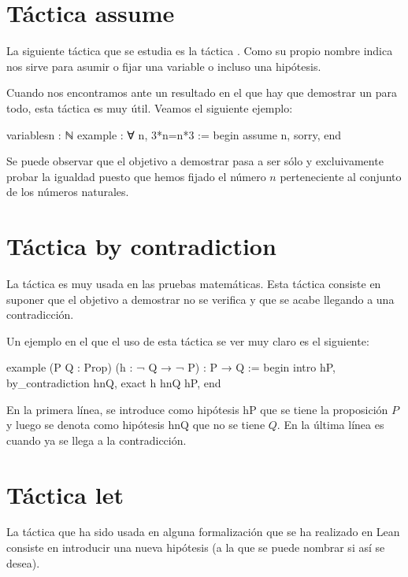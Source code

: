 \section{Táctica assume}

La siguiente táctica que se estudia es la táctica . Como
su propio nombre indica nos sirve para asumir o fijar una variable o incluso una
hipótesis.

Cuando nos encontramos ante un resultado en el que hay que demostrar un para
todo, esta táctica es muy útil. Veamos el siguiente ejemplo:

\begin{leancode}
variables{n : ℕ}
example : ∀ n, 3*n=n*3 :=
begin
  assume n,
  sorry,
end
\end{leancode}

Se puede observar que el objetivo a demostrar pasa a ser sólo y excluivamente
probar la igualdad puesto que hemos fijado el número \(n\) perteneciente al
conjunto de los números naturales.

\section{Táctica by contradiction}

La táctica  es muy
usada en las pruebas matemáticas. Esta táctica consiste en suponer que el
objetivo a demostrar no se verifica y que se acabe llegando a una contradicción.

Un ejemplo en el que el uso de esta táctica se ver muy claro es el siguiente:

\begin{leancode}
example (P Q : Prop) (h : ¬ Q → ¬ P) : P → Q :=
begin
  intro hP,
  by_contradiction hnQ,
  exact h hnQ hP,
end
\end{leancode}

En la primera línea, se introduce como hipótesis hP que se tiene la proposición
\(P\) y luego se denota como hipótesis hnQ que no se tiene \(Q\). En la última
línea es cuando ya se llega a la contradicción.

\section{Táctica let}

La táctica  que ha sido usada en alguna formalización que
se ha realizado en Lean consiste en introducir una nueva hipótesis (a la que
se puede nombrar si así se desea).

